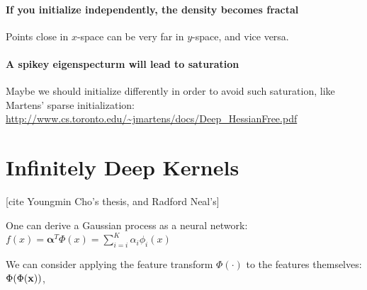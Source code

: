 \documentclass{article}
\begin{document}
\paragraph{If you initialize independently, the density becomes fractal} Points close in $x$-space can be very far in $y$-space, and vice versa.

\paragraph{A spikey eigenspecturm will lead to saturation}
Maybe we should initialize differently in order to avoid such saturation, like Martens' sparse initialization: \url{http://www.cs.toronto.edu/~jmartens/docs/Deep_HessianFree.pdf}

\section{Infinitely Deep Kernels}

[cite Youngmin Cho's thesis, and Radford Neal's]

One can derive a Gaussian process as a neural network: $f(x) = {\mathbf \alpha}^T \Phi(x) = \sum_{i=i}^K \alpha_i \phi_i(x)$

We can consider applying the feature transform $\Phi(\cdot)$ to the features themselves:  $\Phi(\Phi({\bf{x}}))$, 
\end{document}
